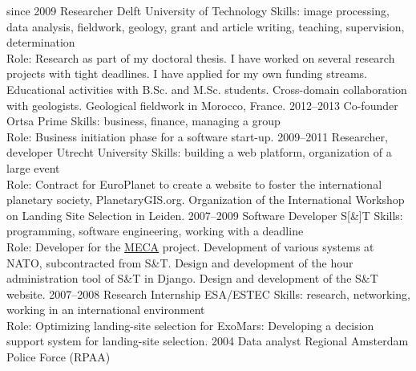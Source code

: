 \documentclass[a4paper]{friggeri-cv}
\begin{document}
\begin{entrylist}
  \entry
    {since 2009}
    {Researcher}
    {Delft University of Technology}
    { {Skills:} {image processing, data analysis, fieldwork, geology, grant and article writing, teaching, supervision, determination} \\
      {Role:} {Research as part of my doctoral thesis. I have worked on several research projects with tight deadlines. I have applied for my own funding streams. Educational activities with B.Sc. and M.Sc. students. Cross-domain collaboration with geologists. Geological fieldwork in Morocco, France. }}
  \entry
    {2012–2013}
    {Co-founder}
    {Ortsa Prime}
    { {Skills:} { business, finance, managing a group } \\
    {Role:} {Business initiation phase for a software start-up. }}
  \entry
    {2009–2011}
    {Researcher, developer}
    {Utrecht University}
    { {Skills:} { building a web platform, organization of a large event } \\
    {Role:} {Contract for EuroPlanet to create a website to foster the international planetary society, PlanetaryGIS.org. 
    Organization of the International Workshop on Landing Site Selection in Leiden.}}
  \entry
    {2007–2009}
    {Software Developer}
    {S[\&]T}
    { {Skills:} { programming, software engineering, working with a deadline } \\
    {Role:} { Developer for the \href{http://crewassistant.com}{MECA} project. 
            Development of various systems at NATO, subcontracted from S\&T. 
            Design and development of the hour administration tool of S\&T in Django. 
            Design and development of the S\&T website.}}
  \entry
    {2007–2008}
    {Research Internship}
    {ESA/ESTEC}
    { {Skills:} { research, networking, working in an international environment } \\
    {Role:} {Optimizing landing-site selection for ExoMars: Developing a decision support system for landing-site selection. }}
  \entry
    {2004}
    {Data analyst}
    {Regional Amsterdam Police Force (RPAA)}

\end{entrylist}
\end{document}
